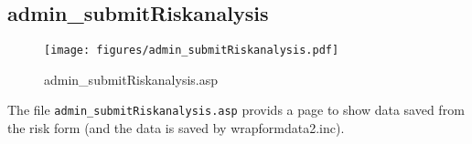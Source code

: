 \subsection{admin\_submitRiskanalysis}
\begin{figure}[htb]
    \begin{center}
        \texttt{[image: figures/admin\_submitRiskanalysis.pdf]}
    \end{center}
    \caption{admin\_submitRiskanalysis.asp}
    \label{fig:admin_submitRiskanalysis}
\end{figure}

The file \verb|admin_submitRiskanalysis.asp| provids a page to show data saved
from the risk form (and the data is saved by wrapformdata2.inc).
